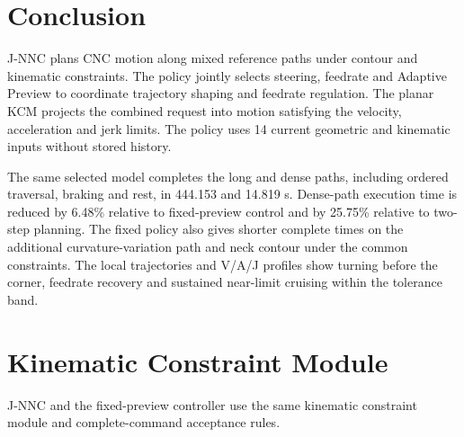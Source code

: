 \documentclass[pdflatex,sn-apa]{sn-jnl}
\begin{document}

\FloatBarrier
\section{Conclusion}
\label{sec:conclusion}
J-NNC plans CNC motion along mixed reference paths under contour and kinematic constraints. The policy jointly selects steering, feedrate and Adaptive Preview to coordinate trajectory shaping and feedrate regulation. The planar KCM projects the combined request into motion satisfying the velocity, acceleration and jerk limits. The policy uses 14 current geometric and kinematic inputs without stored history.

The same selected model completes the long and dense paths, including ordered traversal, braking and rest, in 444.153{} and 14.819{} s. Dense-path execution time is reduced by 6.48\% relative to fixed-preview control and by 25.75\% relative to two-step planning. The fixed policy also gives shorter complete times on the additional curvature-variation path and neck contour under the common constraints. The local trajectories and V/A/J profiles show turning before the corner, feedrate recovery and sustained near-limit cruising within the tolerance band.

\appendix
\section{Kinematic Constraint Module}
\label{app:kcm}
J-NNC and the fixed-preview controller use the same kinematic constraint module and complete-command acceptance rules.
\end{document}
